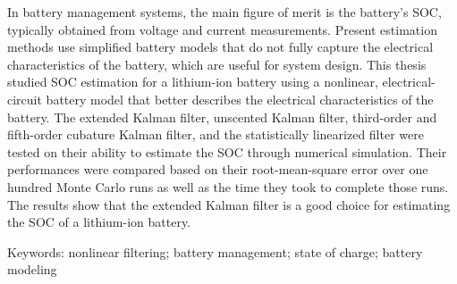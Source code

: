 In battery management systems, the main figure of merit is the battery's SOC, typically obtained from voltage and current measurements.
Present estimation methods use simplified battery models that do not fully capture the electrical characteristics of the battery, which are useful for system design.
This thesis studied SOC estimation for a lithium-ion battery using a nonlinear, electrical-circuit battery model that better describes the electrical characteristics of the battery.
The extended Kalman filter, unscented Kalman filter, third-order and fifth-order cubature Kalman filter, and the statistically linearized filter were tested on their ability to estimate the SOC through numerical simulation.
Their performances were compared based on their root-mean-square error over one hundred Monte Carlo runs as well as the time they took to complete those runs.
The results show that the extended Kalman filter is a good choice for estimating the SOC of a lithium-ion battery.

\vfill

Keywords: nonlinear filtering; battery management; state of charge; battery modeling